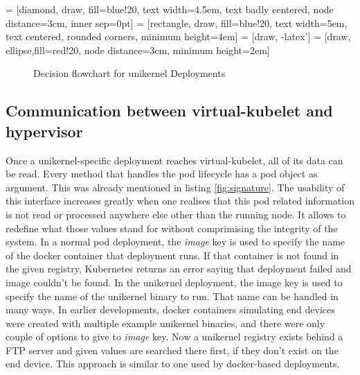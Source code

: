  = [diamond, draw, fill=blue!20, 
    text width=4.5em, text badly centered, node distance=3cm, inner sep=0pt]
 = [rectangle, draw, fill=blue!20, 
    text width=5em, text centered, rounded corners, minimum height=4em]
 = [draw, -latex']
 = [draw, ellipse,fill=red!20, node distance=3cm,
    minimum height=2em]
  \begin{figure}[!h]
    \centering
{}
\caption{Decision flowchart for unikernel Deployments}
\label{fig:deployment-flowchart}
\end{figure}
\subsection{Communication between virtual-kubelet and hypervisor}
Once a unikernel-specific deployment reaches virtual-kubelet, all of its data can be read. Every method that handles the pod lifecycle has a pod object as argument. This was already mentioned in listing \ref{fig:signature}. The usability of this interface increases greatly when one realises that this pod related information is not read or processed anywhere else other than the running node. It allows to redefine what those values stand for without comprimising the integrity of the system. In a normal pod deployment, the \textit{image} key is used to specify the name of the docker container that deployment runs. If that container is not found in the given registry, Kubernetes returns an error saying that deployment failed and image couldn't be found. In the unikernel deployment, the image key is used to specify the name of the unikernel binary to run. That name can be handled in many ways. In earlier developments, docker containers simulating end devices were created with multiple example unikernel binaries, and there were only couple of options to give to \textit{image} key. Now a unikernel registry exists behind a FTP server and given values are searched there first, if they don't exist on the end device. This approach is similar to one used by docker-based deployments.

